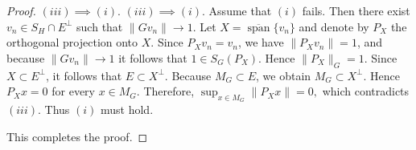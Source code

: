 \documentclass[10pt,a4paper]{amsart}
\begin{document}
\begin{proof}
		
		\medskip
		
		
		\noindent
		$(iii)\implies (i).$ $(iii)\implies (i)$. Assume that $(i)$ fails. Then there exist $v_n\in S_H\cap E^\perp$ such that $\|Gv_n\|\to1$. Let $X=\overline{\operatorname{span}}\{v_n\}$ and denote by $P_X$ the orthogonal projection onto $X$. Since $P_Xv_n=v_n$, we have $\|P_Xv_n\|=1$, and because $\|Gv_n\|\to1$ it follows that $1\in S_G(P_X)$. Hence $\|P_X\|_G=1$. Since $X \subset E^\perp$, it follows that $E\subset X^\perp$. Because $M_G \subset E$, we obtain $M_G \subset X^\perp$. Hence $P_X x = 0$ for every $x \in M_G$. Therefore, $\sup_{x\in M_G}\|P_Xx\|=0,$ which contradicts $(iii)$. Thus $(i)$ must hold. 
		
		\medskip
		
		This completes the proof.
	\end{proof}
\end{document}

